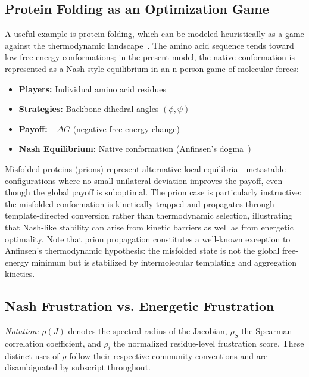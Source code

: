 \documentclass[12pt,a4paper]{article}
\theoremstyle{remark}
\begin{document}
\subsection{Protein Folding as an Optimization Game}

A useful example is protein folding, which can be modeled heuristically as a game against the thermodynamic landscape~\citep{EnzymeFolding}. The amino acid sequence tends toward low-free-energy conformations; in the present model, the native conformation is represented as a Nash-style equilibrium in an n-person game of molecular forces:

\begin{itemize}
    \item \textbf{Players:} Individual amino acid residues
    \item \textbf{Strategies:} Backbone dihedral angles $(\phi, \psi)$
    \item \textbf{Payoff:} $-\Delta G$ (negative free energy change)
    \item \textbf{Nash Equilibrium:} Native conformation (Anfinsen's dogma~\citep{Anfinsen1973})
\end{itemize}

Misfolded proteins (prions) represent alternative local equilibria---metastable configurations where no small unilateral deviation improves the payoff, even though the global payoff is suboptimal. The prion case is particularly instructive: the misfolded conformation is kinetically trapped and propagates through template-directed conversion rather than thermodynamic selection, illustrating that Nash-like stability can arise from kinetic barriers as well as from energetic optimality. Note that prion propagation constitutes a well-known exception to Anfinsen's thermodynamic hypothesis: the misfolded state is not the global free-energy minimum but is stabilized by intermolecular templating and aggregation kinetics.

\subsection{Nash Frustration vs. Energetic Frustration}

\noindent\textit{Notation:} $\rho(J)$ denotes the spectral radius of the Jacobian, $\rho_S$ the Spearman correlation coefficient, and $\rho_i$ the normalized residue-level frustration score. These distinct uses of $\rho$ follow their respective community conventions and are disambiguated by subscript throughout.
\end{document}
